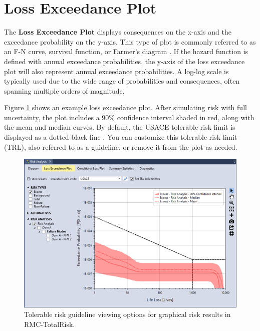 \documentclass[
]{book}
\begin{document}
\hypertarget{loss-exceedance-plot}{%
\section{Loss Exceedance Plot}\label{loss-exceedance-plot}}

The \textbf{Loss Exceedance Plot} displays consequences on the x-axis and the exceedance probability on the y-axis. This type of plot is commonly referred to as an F-N curve, survival function, or Farmer's diagram \citep{cite-CenterforChemicalProcessSafety}. If the hazard function is defined with annual exceedance probabilities, the y-axis of the loss exceedance plot will also represent annual exceedance probabilities. A log-log scale is typically used due to the wide range of probabilities and consequences, often spanning multiple orders of magnitude.

Figure \ref{fig:figure-138} shows an example loss exceedance plot. After simulating risk with full uncertainty, the plot includes a 90\% confidence interval shaded in red, along with the mean and median curves. By default, the USACE tolerable risk limit is displayed as a dotted black line \citep{cite-ER1156}. You can customize this tolerable risk limit (TRL), also referred to as a guideline, or remove it from the plot as needed.

\begin{figure}

{\centering \includegraphics{images/figure138} 

}

\caption{Tolerable risk guideline viewing options for graphical risk results in RMC-TotalRisk.}\label{fig:figure-138}
\end{figure}
\end{document}
